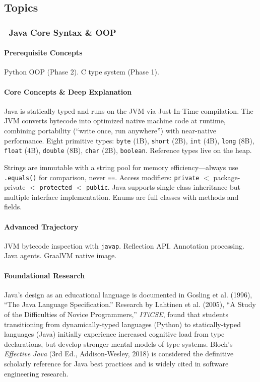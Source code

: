 \documentclass[11pt, a4paper, oneside]{report}
\newcommand{\mustmaster}[1]{\subsubsection{\texorpdfstring{\fcolorbox{blue!40!black}{blue!8}{\footnotesize\bfseries\color{blue!40!black} MUST MASTER}~#1}{#1}}}
\begin{document}
\subsection*{Topics}

\mustmaster{Java Core Syntax \& OOP}

\paragraph{Prerequisite Concepts} Python OOP (Phase 2). C type system (Phase 1).

\paragraph{Core Concepts \& Deep Explanation} Java is statically typed and runs on the JVM via Just-In-Time compilation. The JVM converts bytecode into optimized native machine code at runtime, combining portability (``write once, run anywhere'') with near-native performance. Eight primitive types: \texttt{byte} (1B), \texttt{short} (2B), \texttt{int} (4B), \texttt{long} (8B), \texttt{float} (4B), \texttt{double} (8B), \texttt{char} (2B), \texttt{boolean}. Reference types live on the heap.

Strings are immutable with a string pool for memory efficiency---always use \texttt{.equals()} for comparison, never \texttt{==}. Access modifiers: \texttt{private} $<$ package-private $<$ \texttt{protected} $<$ \texttt{public}. Java supports single class inheritance but multiple interface implementation. Enums are full classes with methods and fields.

\paragraph{Advanced Trajectory} JVM bytecode inspection with \texttt{javap}. Reflection API. Annotation processing. Java agents. GraalVM native image.


\paragraph{Foundational Research} Java's design as an educational language is documented in Gosling et al. (1996), ``The Java Language Specification.'' Research by Lahtinen et al. (2005), ``A Study of the Difficulties of Novice Programmers,'' \emph{ITiCSE}, found that students transitioning from dynamically-typed languages (Python) to statically-typed languages (Java) initially experience increased cognitive load from type declarations, but develop stronger mental models of type systems. Bloch's \emph{Effective Java} (3rd Ed., Addison-Wesley, 2018) is considered the definitive scholarly reference for Java best practices and is widely cited in software engineering research.
\end{document}
